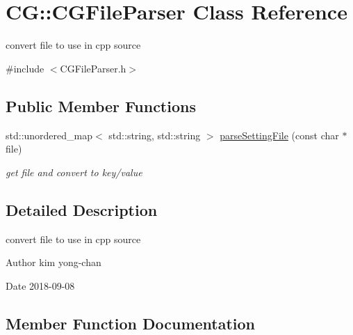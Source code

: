 \hypertarget{class_c_g_1_1_c_g_file_parser}{}\section{CG\+:\+:C\+G\+File\+Parser Class Reference}
\label{class_c_g_1_1_c_g_file_parser}


convert file to use in cpp source  




{\ttfamily \#include $<$C\+G\+File\+Parser.\+h$>$}

\subsection*{Public Member Functions}
\begin{DoxyCompactItemize}
\item 
std\+::unordered\+\_\+map$<$ std\+::string, std\+::string $>$ \mbox{\hyperlink{class_c_g_1_1_c_g_file_parser_a527706748bc55bf13819682a5e82d8b2}{parse\+Setting\+File}} (const char $\ast$file)
\begin{DoxyCompactList}\small\item\em get file and convert to key/value \end{DoxyCompactList}\end{DoxyCompactItemize}


\subsection{Detailed Description}
convert file to use in cpp source 

\begin{DoxyAuthor}{Author}
kim yong-\/chan 
\end{DoxyAuthor}
\begin{DoxyDate}{Date}
2018-\/09-\/08 
\end{DoxyDate}


\subsection{Member Function Documentation}
\mbox{\label{class_c_g_1_1_c_g_file_parser_a527706748bc55bf13819682a5e82d8b2}} 
